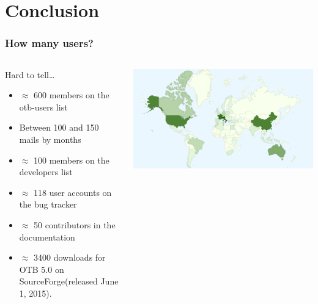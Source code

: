 \documentclass[8pt]{beamer}
\begin{document}
\section{Conclusion}
\begin{frame}
\frametitle{How many users?}
\begin{columns}[c]
\begin{block}{Hard to tell\ldots}
\begin{itemize}
    \item $\approx$ 600 members on the otb-users list
    \item Between 100 and 150 mails by months
    \item $\approx$ 100 members on the developers list
    \item $\approx$ 118 user accounts on the bug tracker
    \item $\approx$ 50 contributors in the documentation
    \item $\approx$ 3400 downloads for OTB 5.0 on SourceForge(released June 1, 2015).
  \end{itemize}
\end{block}
\includegraphics[width=\textwidth]{images/OTB4_download_sourceforge_country_crop.png}
\end{columns}
\end{frame}
\end{document}
